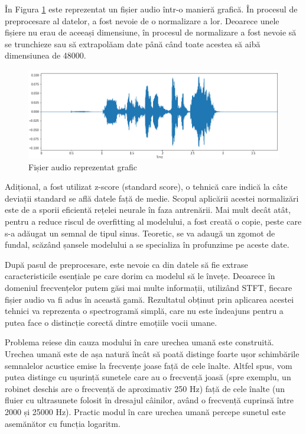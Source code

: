 \documentclass[a4paper, 12pt]{report}
\begin{document}
	În Figura \ref{fig:audio_plot} este reprezentat un fișier audio într-o manieră grafică. În procesul de preprocesare al datelor, a fost nevoie de o normalizare a lor. Deoarece unele fișiere nu erau de aceeași dimensiune, în procesul de normalizare a fost nevoie să se trunchieze sau să extrapolăam date până când toate acestea să aibă dimensiunea de 48000.
	
	\begin{figure}[H]
		\begin{center}
			\includegraphics[scale=0.6]{images/audio_plot.png}
		\end{center}
		\caption{Fișier audio reprezentat grafic}
		\label{fig:audio_plot}
	\end{figure}
	
	Adițional, a fost utilizat z-score (standard score), o tehnică care indică la câte deviații standard se află datele față de medie. Scopul aplicării acestei normalizări este de a sporii eficientă rețelei neurale în faza antrenării. Mai mult decât atât, pentru a reduce riscul de overfitting al modelului, a fost creată o copie, peste care s-a adăugat un semnal de tipul sinus. Teoretic, se va adaugă un zgomot de fundal, scăzând șansele modelului a se specializa în profunzime pe aceste date.
	
	După pasul de preprocesare, este nevoie ca din datele să fie extrase caracteristicile esențiale pe care dorim ca modelul să le învețe. Deoarece în domeniul frecvențelor putem găsi mai multe informații, utilizând STFT, fiecare fișier audio va fi adus în această gamă. Rezultatul obținut prin aplicarea acestei tehnici va reprezenta o spectrogramă simplă, care nu este îndeajuns pentru a putea face o distincție corectă dintre emoțiile vocii umane. 
	
	Problema reiese din cauza modului în care urechea umană este construită. Urechea umană este de așa natură încât să poată distinge foarte ușor schimbările semnalelor acustice emise la frecvențe joase față de cele înalte. Altfel spus, vom putea distinge cu ușurință sunetele care au o frecvență joasă (spre exemplu, un robinet deschis are o frecvență de aproximativ 250 Hz) față de cele înalte (un fluier cu ultrasunete folosit în dresajul câinilor, având o frecvență cuprinsă între 2000 și 25000 Hz). Practic modul în care urechea umană percepe sunetul este asemănător cu funcția logaritm.
	
\end{document}

